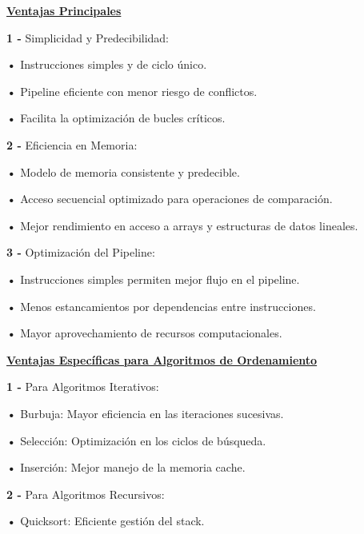 \documentclass{article}
\begin{document}
\textbf{\underline{Ventajas Principales}}

\quad

\textbf{1 -  } { Simplicidad y Predecibilidad:}

\quad

\textbf{•   } { Instrucciones simples y de ciclo único.}

\textbf{•   } { Pipeline eficiente con menor riesgo de conflictos.}

\textbf{•   } { Facilita la optimización de bucles críticos.}

\quad

\textbf{2 -  } { Eficiencia en Memoria:}

\quad

\textbf{•   } { Modelo de memoria consistente y predecible.}

\textbf{•   } { Acceso secuencial optimizado para operaciones de comparación.}

\textbf{•   } { Mejor rendimiento en acceso a arrays y estructuras de datos lineales.}

\quad

\textbf{3 -  } { Optimización del Pipeline:}

\quad

\textbf{•   } { Instrucciones simples permiten mejor flujo en el pipeline.}

\textbf{•   } { Menos estancamientos por dependencias entre instrucciones.}

\textbf{•   } { Mayor aprovechamiento de recursos computacionales.}



\quad

\textbf{\underline{Ventajas Específicas para Algoritmos de Ordenamiento}}

\quad

\textbf{1 -  } { Para Algoritmos Iterativos:}

\quad

\textbf{•   } { Burbuja: Mayor eficiencia en las iteraciones sucesivas.}

\textbf{•   } { Selección: Optimización en los ciclos de búsqueda.}

\textbf{•   } { Inserción: Mejor manejo de la memoria cache.}

\quad

\textbf{2 -  } { Para Algoritmos Recursivos:}

\quad

\textbf{•   } { Quicksort: Eficiente gestión del stack.}
\end{document}
